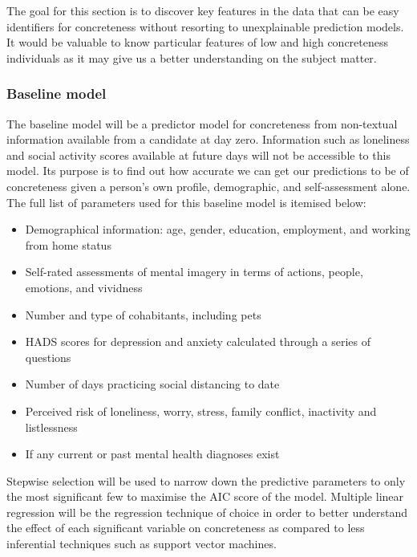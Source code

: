 \documentclass[12pt, a4paper]{article}
\begin{document}
The goal for this section is to discover key features in the data that can be easy identifiers for concreteness without resorting to unexplainable prediction models. It would be valuable to know particular features of low and high concreteness individuals as it may give us a better understanding on the subject matter.

\subsubsection{Baseline model}
The baseline model will be a predictor model for concreteness from non-textual information available from a candidate at day zero. Information such as loneliness and social activity scores available at future days will not be accessible to this model. Its purpose is to find out how accurate we can get our predictions to be of concreteness given a person's own profile, demographic, and self-assessment alone. The full list of parameters used for this baseline model is itemised below: 

\begin{itemize}
  \item Demographical information: age, gender, education, employment, and working from home status
  \item Self-rated assessments of mental imagery in terms of actions, people, emotions, and vividness
  \item Number and type of cohabitants, including pets
  \item HADS scores for depression and anxiety calculated through a series of questions
  \item Number of days practicing social distancing to date
  \item Perceived risk of loneliness, worry, stress, family conflict, inactivity and listlessness
  \item If any current or past mental health diagnoses exist

\end{itemize}

Stepwise selection will be used to narrow down the predictive parameters to only the most significant few to maximise the AIC score of the model. Multiple linear regression will be the regression technique of choice in order to better understand the effect of each significant variable on concreteness as compared to less inferential techniques such as support vector machines. 
\end{document}

